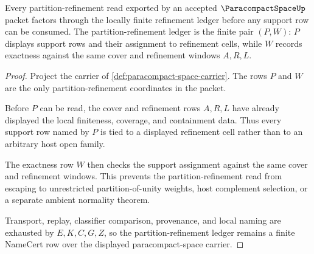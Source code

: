\begin{theorem}
\label{thm:paracompact-space-partition-refinement-ledger}
Every partition-refinement read exported by an accepted $\ParacompactSpaceUp$ packet factors through the locally finite refinement ledger before any support row can be consumed. The partition-refinement ledger is the finite pair $(P,W)$: $P$ displays support rows and their assignment to refinement cells, while $W$ records exactness against the same cover and refinement windows $A,R,L$.
\end{theorem}
\begin{proof}
Project the carrier of \autoref{def:paracompact-space-carrier}. The rows $P$ and $W$ are the only partition-refinement coordinates in the packet.

Before $P$ can be read, the cover and refinement rows $A,R,L$ have already displayed the local finiteness, coverage, and containment data. Thus every support row named by $P$ is tied to a displayed refinement cell rather than to an arbitrary host open family.

The exactness row $W$ then checks the support assignment against the same cover and refinement windows. This prevents the partition-refinement read from escaping to unrestricted partition-of-unity weights, host complement selection, or a separate ambient normality theorem.

Transport, replay, classifier comparison, provenance, and local naming are exhausted by $E,K,C,G,Z$, so the partition-refinement ledger remains a finite NameCert row over the displayed paracompact-space carrier.
\end{proof}


\begin{closurestatus}{\ParacompactSpaceUp}
  \theoryclosure{\seedClosure}
  \formalstatus{\unformalizedV}
\end{closurestatus}
